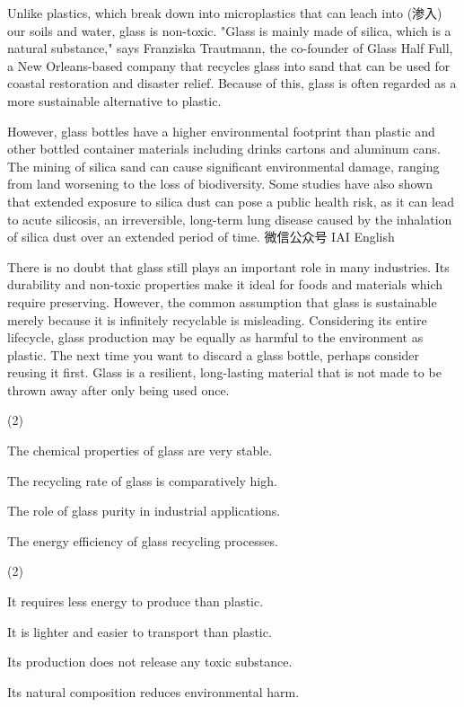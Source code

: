 \documentclass{英语试卷}
\begin{document}
\par Unlike plastics, which break down into microplastics that can leach into (渗入) our soils and water, glass is non-toxic. "Glass is mainly made of silica, which is a natural substance," says Franziska Trautmann, the co-founder of Glass Half Full, a New Orleans-based company that recycles glass into sand that can be used for coastal restoration and disaster relief. Because of this, glass is often regarded as a more sustainable alternative to plastic.\par
\par However, glass bottles have a higher environmental footprint than plastic and other bottled container materials including drinks cartons and aluminum cans. The mining of silica sand can cause significant environmental damage, ranging from land worsening to the loss of biodiversity. Some studies have also shown that extended exposure to silica dust can pose a public health risk, as it can lead to acute silicosis, an irreversible, long-term lung disease caused by the inhalation of silica dust over an extended period of time. 微信公众号 IAI English\par
\par There is no doubt that glass still plays an important role in many industries. Its durability and non-toxic properties make it ideal for foods and materials which require preserving. However, the common assumption that glass is sustainable merely because it is infinitely recyclable is misleading. Considering its entire lifecycle, glass production may be equally as harmful to the environment as plastic. The next time you want to discard a glass bottle, perhaps consider reusing it first. Glass is a resilient, long-lasting material that is not made to be thrown away after only being used once.\par
{}
\begin{choices}(2)
  \item The chemical properties of glass are very stable.
  \item The recycling rate of glass is comparatively high.
  \item The role of glass purity in industrial applications.
  \item The energy efficiency of glass recycling processes.
\end{choices}
\begin{choices}(2)
  \item It requires less energy to produce than plastic.
  \item It is lighter and easier to transport than plastic.
  \item Its production does not release any toxic substance.
  \item Its natural composition reduces environmental harm.
\end{choices}
\end{document}
